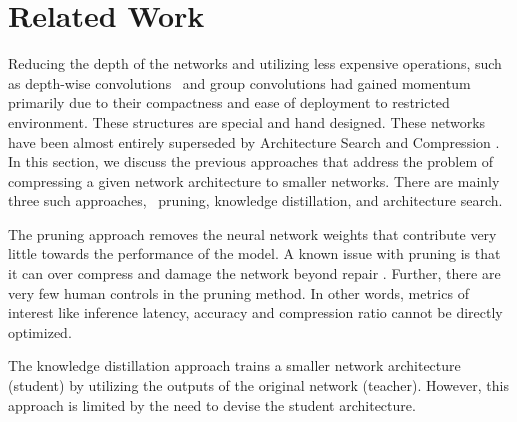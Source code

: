 \documentclass[../main]{subfiles}
\begin{document}
\section{Related Work}
    \label{sec:related}
    Reducing the depth of the networks \cite{iandola2016squeezenet} and utilizing less expensive operations, such as depth-wise convolutions~\cite{howard2017mobilenets} and group convolutions \cite{cheng2017survey} had gained momentum primarily due to their compactness and ease of deployment to restricted environment.
    These structures are special and hand designed.
    These networks have been almost entirely superseded by Architecture Search \cite{zoph2017learning, jin2018efficient} and Compression \cite{tan2018mnasnet,he2018amc}.
    In this section, we discuss the previous approaches that address the problem of compressing a given network architecture to smaller networks.
    There are mainly three such approaches, \viz~pruning, knowledge distillation, and architecture search.
    
    The pruning approach \cite{lecun1990optimal,srinivas2015data,guo2016dynamic,anwar2017structured} removes the neural network weights that contribute very little towards the performance of the model.
    A known issue with pruning is that it can over compress and damage the network beyond repair \cite{molchanov2016pruning}.
    Further, there are very few human controls in the pruning method.
    In other words, metrics of interest like inference latency, accuracy and compression ratio cannot be directly optimized.
    
    The knowledge distillation approach \cite{hinton2015distilling,romero2014fitnets,ba2014deep} trains a smaller network architecture (student) by utilizing the outputs of the original network (teacher).
    However, this approach is limited by the need to devise the student architecture.
\end{document}
